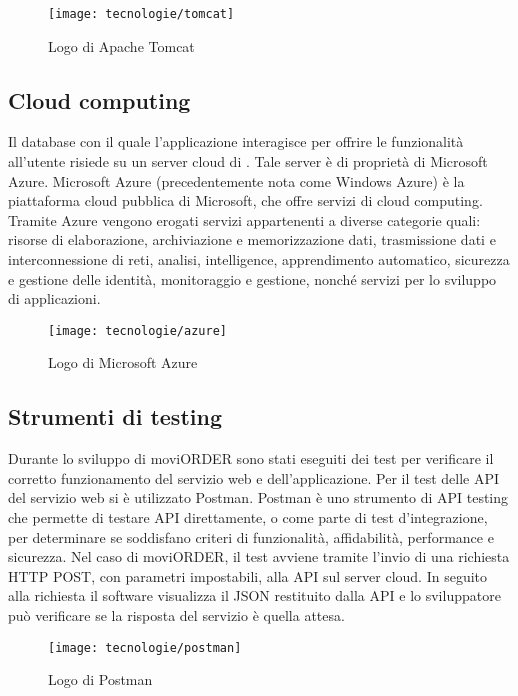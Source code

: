 \begin{figure}[!h] 
    \centering 
    \texttt{[image: tecnologie/tomcat]} 
    \caption{Logo di Apache Tomcat}
\end{figure}

\subsection{Cloud computing}

Il database con il quale l'applicazione interagisce per offrire le funzionalità all'utente risiede su un server cloud di \visione{}. Tale server è di proprietà di Microsoft Azure. Microsoft Azure (precedentemente nota come Windows Azure) è la piattaforma cloud pubblica di Microsoft, che offre servizi di cloud computing. Tramite Azure vengono erogati servizi appartenenti a diverse categorie quali: risorse di elaborazione, archiviazione e memorizzazione dati, trasmissione dati e interconnessione di reti, analisi, intelligence, apprendimento automatico, sicurezza e gestione delle identità, monitoraggio e gestione, nonché servizi per lo sviluppo di applicazioni.

\begin{figure}[!h] 
    \centering 
    \texttt{[image: tecnologie/azure]} 
    \caption{Logo di Microsoft Azure}
\end{figure}

\subsection{Strumenti di testing}

Durante lo sviluppo di moviORDER sono stati eseguiti dei test per verificare il corretto funzionamento del servizio web e dell'applicazione. Per il test delle API del servizio web si è utilizzato Postman. Postman è uno strumento di API testing che permette di testare API direttamente, o come parte di test d'integrazione, per determinare se soddisfano criteri di funzionalità, affidabilità, performance e sicurezza. Nel caso di moviORDER, il test avviene tramite l'invio di una richiesta HTTP POST, con parametri impostabili, alla API sul server cloud. In seguito alla richiesta il software visualizza il JSON restituito dalla API e lo sviluppatore può verificare se la risposta del servizio è quella attesa.

\begin{figure}[!h] 
    \centering 
    \texttt{[image: tecnologie/postman]} 
    \caption{Logo di Postman}
\end{figure}

